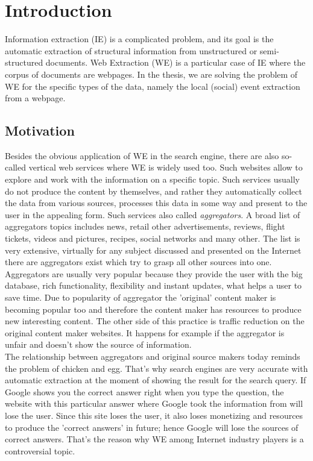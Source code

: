 \chapter{Introduction}
\label{chap:intro}
Information extraction (IE) is a complicated problem, and its goal is the automatic extraction of structural information from unstructured or semi-structured documents. Web Extraction (WE) is a particular case of IE where the corpus of documents are webpages. In the thesis, we are solving the problem of WE for the specific types of the data, namely the local (social) event extraction from a webpage.   


\section{Motivation}
Besides the obvious application of WE in the search engine, there are also so-called vertical web services where WE is widely used too. Such websites allow to explore and work with the information on a specific topic. Such services usually do not produce the content by themselves, and rather they automatically collect the data from various sources, processes this data in some way and present to the user in the appealing form. Such services also called \textit{aggregators}. A broad list of aggregators topics includes news, retail other advertisements, reviews, flight tickets, videos and pictures, recipes, social networks and many other. The list is very extensive, virtually for any subject discussed and presented on the Internet there are aggregators exist which try to grasp all other sources into one. \\

Aggregators are usually very popular because they provide the user with the big database, rich functionality, flexibility and instant updates, what helps a user to save time. Due to popularity of aggregator the 'original' content maker is becoming popular too and therefore the content maker has resources to produce new interesting content. The other side of this practice is traffic reduction on the original content maker websites. It happens for example if the aggregator is unfair and doesn't show the source of information. \\

The relationship between aggregators and original source makers today reminds the problem of chicken and egg. That's why search engines are very accurate with automatic extraction at the moment of showing the result for the search query. If Google shows you the correct answer right when you type the question, the website with this particular answer where Google took the information from will lose the user. Since this site loses the user, it also loses monetizing and resources to produce the 'correct answers' in future; hence Google will lose the sources of correct answers. That's the reason why WE among Internet industry players is a controversial topic.\\

